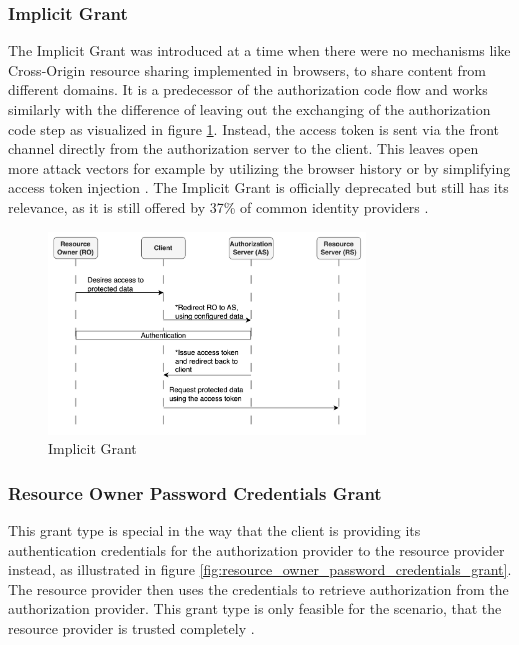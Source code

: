 \documentclass[
    fontsize=12pt,
    headings=small,
    parskip=half,           %
    bibliography=totoc,
    numbers=noenddot,       %
    open=any,               %
    ]{scrreprt}
\begin{document}
\subsubsection{Implicit Grant}
The Implicit Grant was introduced at a time when there were no mechanisms like Cross-Origin resource sharing implemented in browsers, to share content from different domains. It is a predecessor of the authorization code flow and works similarly with the difference of leaving out the exchanging of the authorization code step as visualized in figure \ref{fig:implicit_grant}. Instead, the access token is sent via the front channel directly from the authorization server to the client. This leaves open more attack vectors for example by utilizing the browser history or by simplifying access token injection \cite{lodderstedt2020oauth}. The Implicit Grant is officially deprecated but still has its relevance, as it is still offered by 37\% of common identity providers \cite{philippaerts2022oauch}.

\begin{figure}[ht]
	\sffamily\footnotesize
	\includegraphics[width=0.75\textwidth]{pic/implicit_grant.png}
	\unitlength=0.75mm
	\linethickness{0.4pt}
	\caption{Implicit Grant}
	\label{fig:implicit_grant}
\end{figure}

\subsubsection{Resource Owner Password Credentials Grant}
This grant type is special in the way that the client is providing its authentication credentials for the authorization provider to the resource provider instead, as illustrated in figure \ref{fig:resource_owner_password_credentials_grant}. The resource provider then uses the credentials to retrieve authorization from the authorization provider. This grant type is only feasible for the scenario, that the resource provider is trusted completely \cite{hardt2012rfc}.
\end{document}
